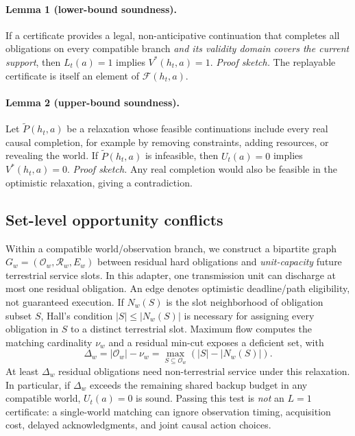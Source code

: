 \documentclass[conference]{IEEEtran}
\newcommand{\Ob}{\mathcal{O}}
\newcommand{\Choices}{\mathcal{F}}
\newcommand{\Res}{\mathcal{R}}
\begin{document}
\paragraph{Lemma 1 (lower-bound soundness).}
If a certificate provides a legal, non-anticipative continuation that completes all obligations on every compatible branch \emph{and its validity domain covers the current support}, then $L_t(a)=1$ implies $V^*(h_t,a)=1$.
\emph{Proof sketch.} The replayable certificate is itself an element of $\Choices(h_t,a)$.

\paragraph{Lemma 2 (upper-bound soundness).}
Let $\widetilde P(h_t,a)$ be a relaxation whose feasible continuations include every real causal completion, for example by removing constraints, adding resources, or revealing the world. If $\widetilde P(h_t,a)$ is infeasible, then $U_t(a)=0$ implies $V^*(h_t,a)=0$.
\emph{Proof sketch.} Any real completion would also be feasible in the optimistic relaxation, giving a contradiction.

\subsection{Set-level opportunity conflicts}
Within a compatible world/observation branch, we construct a bipartite graph $G_w=(\Ob_w,\Res_w,E_w)$ between residual hard obligations and \emph{unit-capacity} future terrestrial service slots. In this adapter, one transmission unit can discharge at most one residual obligation. An edge denotes optimistic deadline/path eligibility, not guaranteed execution. If $N_w(S)$ is the slot neighborhood of obligation subset $S$, Hall's condition $|S|\le |N_w(S)|$ is necessary for assigning every obligation in $S$ to a distinct terrestrial slot. Maximum flow computes the matching cardinality $\nu_w$ and a residual min-cut exposes a deficient set, with
\begin{equation}
\Delta_w=|\Ob_w|-\nu_w
=\max_{S\subseteq\Ob_w}(|S|-|N_w(S)|).
\end{equation}
At least $\Delta_w$ residual obligations need non-terrestrial service under this relaxation. In particular, if $\Delta_w$ exceeds the remaining shared backup budget in any compatible world, $U_t(a)=0$ is sound. Passing this test is \emph{not} an $L=1$ certificate: a single-world matching can ignore observation timing, acquisition cost, delayed acknowledgments, and joint causal action choices.
\end{document}
